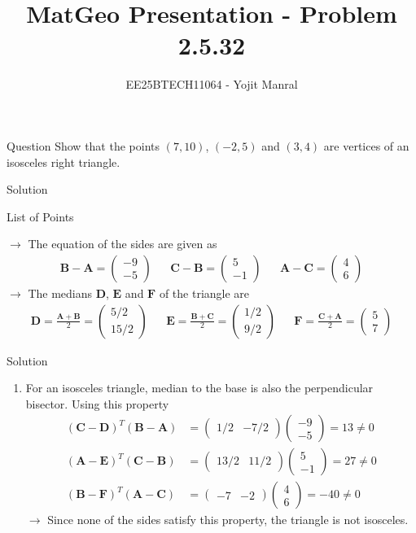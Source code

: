 \documentclass{beamer}
\title{MatGeo Presentation - Problem 2.5.32}
\author{EE25BTECH11064 - Yojit Manral}
\date{}
\numberwithin{equation}{section}
\providecommand{\brak}[1]{\ensuremath{\left(#1\right)}}
\theoremstyle{remark}
\newcommand{\myvec}[1]{\ensuremath{\begin{pmatrix}#1\end{pmatrix}}}
\let\vec\mathbf
\begin{document}
\frame{\titlepage}
\begin{frame}{Question}
Show that the points $\brak{7,10}$, $\brak{-2,5}$ and $\brak{3,4}$ are vertices of an isosceles right triangle.
\end{frame}

\begin{frame}{Solution}
\begin{table}[h!]    
  \centering
  
  \caption{List of Points}
  \label{Table_1}
\end{table}

$\rightarrow$ The equation of the sides are given as
\begin{align}
    \vec{B}-\vec{A}=\myvec{-9\\-5} && \vec{C}-\vec{B}=\myvec{5\\-1} && \vec{A}-\vec{C}=\myvec{4\\6}
\end{align}
$\rightarrow$ The medians $\vec{D}$, $\vec{E}$ and $\vec{F}$ of the triangle are
\begin{align}
    \vec{D} = \frac{\vec{A}+\vec{B}}{2} = \myvec{5/2\\15/2} &&
    \vec{E} = \frac{\vec{B}+\vec{C}}{2} = \myvec{1/2\\9/2} &&
    \vec{F} = \frac{\vec{C}+\vec{A}}{2} = \myvec{5\\7}
\end{align}
\end{frame}

\begin{frame}{Solution}
\begin{enumerate}[label=(\Alph*)]
\item {
For an isosceles triangle, median to the base is also the perpendicular bisector. Using this property
\begin{align}
    (\vec{C}-\vec{D})^T(\vec{B}-\vec{A}) &= \myvec{1/2&-7/2}\myvec{-9\\-5} = 13 \neq 0 \\
    (\vec{A}-\vec{E})^T(\vec{C}-\vec{B}) &= \myvec{13/2&11/2}\myvec{5\\-1} = 27 \neq 0 \\
    (\vec{B}-\vec{F})^T(\vec{A}-\vec{C}) &= \myvec{-7&-2}\myvec{4\\6} = -40 \neq 0
\end{align}
$\rightarrow$ Since none of the sides satisfy this property, the triangle is not isosceles.
}
\end{enumerate}
\end{frame}
\end{document}
